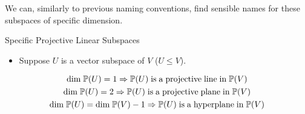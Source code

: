 We can, similarly to previous naming conventions, find sensible names for these subspaces of specific dimension.
\begin{exampleBox}{Specific Projective Linear Subspaces}
    \begin{itemize}
        \item Suppose $U$ is a vector subspace of $V$ ($U \leq V$).
    \end{itemize}
    \begin{gather*}
        \mathrm{dim} \; \mathbb{P}(U) = 1 \Rightarrow \mathbb{P}(U) \mathrm{\;is\;a\;projective\;line\;in\;}\mathbb{P}(V) \\
        \mathrm{dim} \; \mathbb{P}(U) = 2 \Rightarrow \mathbb{P}(U) \mathrm{\;is\;a\;projective\;plane\;in\;}\mathbb{P}(V) \\
        \mathrm{dim} \; \mathbb{P}(U) = \mathrm{dim\;} \mathbb{P}(V) - 1 \Rightarrow \mathbb{P}(U) \mathrm{\;is\;a\;hyperplane\;in\;}\mathbb{P}(V) \\  
    \end{gather*}
\end{exampleBox}






